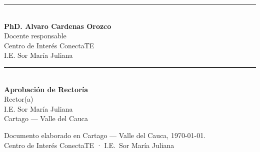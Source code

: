 \documentclass[12pt, letterpaper]{article}
\begin{document}
\vspace{1.4cm}

\noindent
\begin{minipage}[t]{0.45\textwidth}\centering
\rule{\linewidth}{0.5pt}\\[3pt]
\textbf{\color{smjAzul} PhD. Alvaro Cardenas Orozco}\\
\small Docente responsable\\
Centro de Interés ConectaTE\\
I.E. Sor María Juliana
\end{minipage}
\hfill
\begin{minipage}[t]{0.45\textwidth}\centering
\rule{\linewidth}{0.5pt}\\[3pt]
\textbf{\color{smjAzul} Aprobación de Rectoría}\\
\small Rector(a)\\
I.E. Sor María Juliana\\
Cartago — Valle del Cauca
\end{minipage}

\vspace{1.2cm}

\begin{center}
\small\color{gray}
Documento elaborado en Cartago — Valle del Cauca, \today.\\
Centro de Interés ConectaTE · I.E.\ Sor María Juliana
\end{center}
\end{document}
